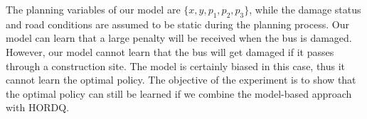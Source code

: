 
The planning variables of our model are $\{x, y, p_1, p_2, p_3\}$, while the damage
status and road conditions are assumed to be static during the planning process.
Our model can learn that a large penalty will be received when the bus is damaged.  
However, our model cannot learn that the bus will get damaged if it passes through
a construction site. The model is certainly biased in this case, thus
it cannot learn the optimal policy. The objective of 
the experiment is to show that the optimal policy can still be learned
if we combine the model-based approach with HORDQ. 



